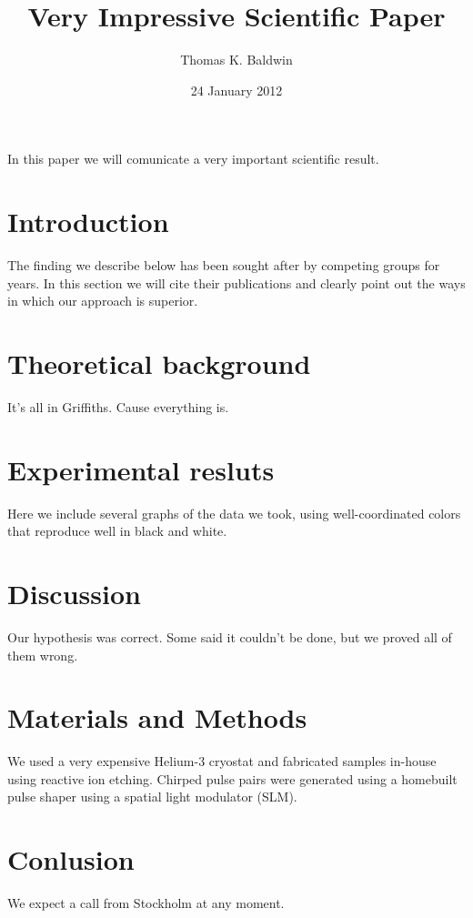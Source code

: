 \documentclass[11pt]{amsart}
\title{Very Impressive Scientific Paper}
\author{Thomas K. Baldwin}
\date{24 January 2012}
\begin{document}
\maketitle

In this paper we will comunicate a very important scientific result.

\section{Introduction}

The finding we describe below has been sought after by competing groups
for years. In this section we will cite their publications and clearly
point out the ways in which our approach is superior.

\section{Theoretical background}

It's all in Griffiths. Cause everything is. 

\section{Experimental resluts}

Here we include several graphs of the data we
took, using well-coordinated colors that reproduce well in black and
white.

\section{Discussion}

Our hypothesis was correct. Some said it couldn't be done, but we
proved all of them wrong.

\section{Materials and Methods}

We used a very expensive Helium-3 cryostat and fabricated samples
in-house using reactive ion etching. Chirped pulse pairs were
generated using a homebuilt pulse shaper using a spatial light
modulator (SLM).

\section{Conlusion}

We expect a call from Stockholm at any moment.
\end{document}
